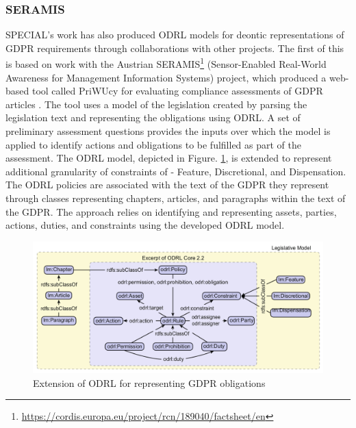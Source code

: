 \subsubsection{SERAMIS}
SPECIAL's work has also produced ODRL models for deontic representations of GDPR requirements through collaborations with other projects. The first of this is based on work with the Austrian SERAMIS\footnote{\url{https://cordis.europa.eu/project/rcn/189040/factsheet/en}} (Sensor-Enabled Real-World Awareness for Management Information Systems) project, which produced a web-based tool called PriWUcy for evaluating compliance assessments of GDPR articles \cite{agarwal_d5.5_2017,agarwal_legislative_2018}.
The tool uses a model of the legislation created by parsing the legislation text and representing the obligations using ODRL. A set of preliminary assessment questions provides the inputs over which the model is applied to identify actions and obligations to be fulfilled as part of the assessment. The ODRL model, depicted in Figure. \ref{fig:SPECIAL-ODRL}, is extended to represent additional granularity of constraints of - Feature, Discretional, and Dispensation. The ODRL policies are associated with the text of the GDPR they represent through classes representing chapters, articles, and paragraphs within the text of the GDPR. The approach relies on identifying and representing assets, parties, actions, duties, and constraints using the developed ODRL model.
\begin{figure}[htbp]
    \centering
    \includegraphics[width=\linewidth]{img/SPECIAL_ODRL.png}
    \caption{Extension of ODRL for representing GDPR obligations \cite{agarwal_legislative_2018}}
    \label{fig:SPECIAL-ODRL}
\end{figure}

